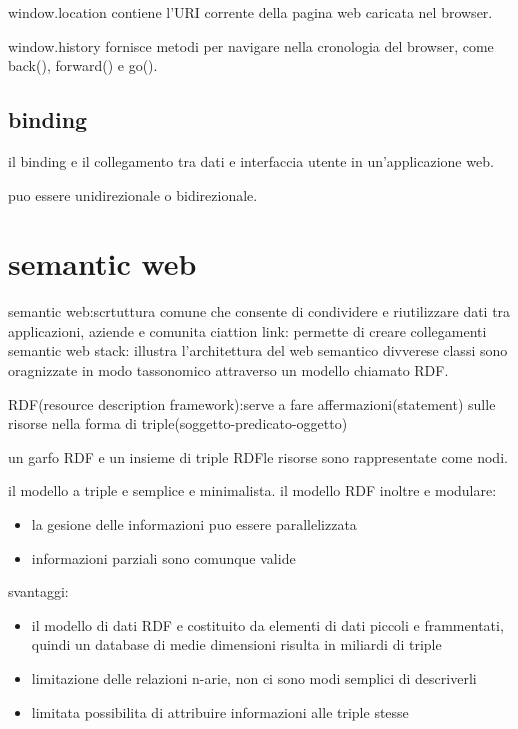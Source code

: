 \documentclass[12pt]{article}
\begin{document}
window.location contiene l'URI corrente della pagina web caricata nel browser.

window.history fornisce metodi per navigare nella cronologia del browser, come back(), forward() e go().

\subsection{binding}

il binding e il collegamento tra dati e interfaccia utente in un'applicazione web.

puo essere unidirezionale o bidirezionale.
















\section{semantic web}
semantic web:scrtuttura comune che consente di condividere e riutilizzare dati tra applicazioni, aziende e comunita
ciattion link: permette di creare collegamenti
semantic web stack: illustra l'architettura del web semantico
divverese classi sono oragnizzate in modo tassonomico attraverso un modello chiamato RDF.

RDF(resource description framework):serve a fare affermazioni(statement) sulle risorse nella forma di triple(soggetto-predicato-oggetto)

un garfo RDF e un insieme di triple RDFle risorse sono rappresentate come nodi.

il modello a triple e semplice e minimalista. il modello RDF inoltre e modulare:
\begin{itemize}
    \item la gesione delle informazioni puo essere parallelizzata
    \item informazioni parziali sono comunque valide
    \end{itemize}

    svantaggi:
    \begin{itemize}
        \item il modello di dati RDF e costituito da elementi di dati piccoli e frammentati, quindi un database di medie dimensioni risulta in miliardi di triple
        \item limitazione delle relazioni n-arie, non ci sono modi semplici di descriverli
        \item limitata possibilita di attribuire informazioni alle triple stesse
    \end{itemize}
\end{document}
